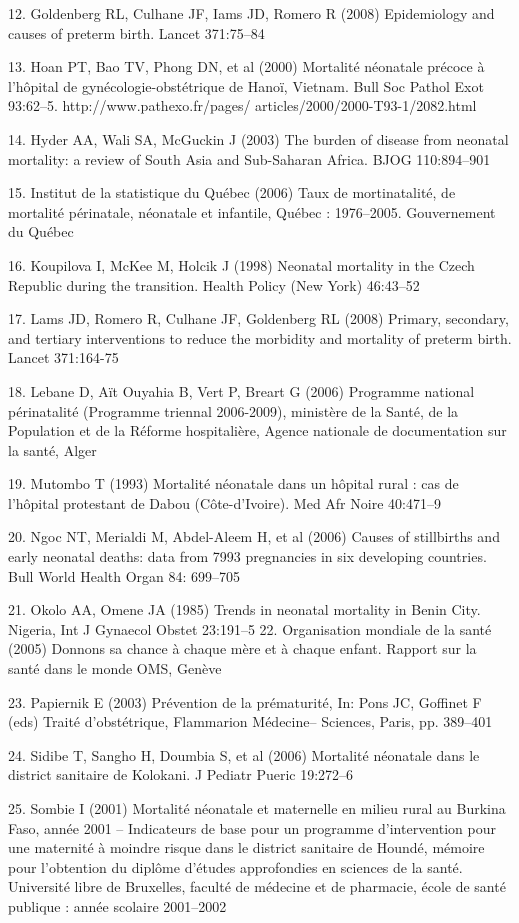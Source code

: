 12. Goldenberg RL, Culhane JF, Iams JD, Romero R (2008)
Epidemiology and causes of preterm birth. Lancet 371:75–84


13. Hoan PT, Bao TV, Phong DN, et al (2000) Mortalité néonatale
précoce à l’hôpital de gynécologie-obstétrique de Hanoï, Vietnam.
Bull Soc Pathol Exot 93:62–5. http://www.pathexo.fr/pages/
articles/2000/2000-T93-1/2082.html


14. Hyder AA, Wali SA, McGuckin J (2003) The burden of disease
from neonatal mortality: a review of South Asia and Sub-Saharan
Africa. BJOG 110:894–901


15. Institut de la statistique du Québec (2006) Taux de mortinatalité,
de mortalité périnatale, néonatale et infantile, Québec :
1976–2005. Gouvernement du Québec


16. Koupilova I, McKee M, Holcik J (1998) Neonatal mortality in the
Czech Republic during the transition. Health Policy (New York)
46:43–52


17. Lams JD, Romero R, Culhane JF, Goldenberg RL (2008) Primary,
secondary, and tertiary interventions to reduce the morbidity and
mortality of preterm birth. Lancet 371:164-75


18. Lebane D, Aït Ouyahia B, Vert P, Breart G (2006) Programme
national périnatalité (Programme triennal 2006-2009), ministère
de la Santé, de la Population et de la Réforme hospitalière, Agence
nationale de documentation sur la santé, Alger


19. Mutombo T (1993) Mortalité néonatale dans un hôpital rural : cas
de l’hôpital protestant de Dabou (Côte-d’Ivoire). Med Afr Noire
40:471–9


20. Ngoc NT, Merialdi M, Abdel-Aleem H, et al (2006) Causes of
stillbirths and early neonatal deaths: data from 7993 pregnancies
in six developing countries. Bull World Health Organ 84:
699–705


21. Okolo AA, Omene JA (1985) Trends in neonatal mortality in
Benin City. Nigeria, Int J Gynaecol Obstet 23:191–5
22. Organisation mondiale de la santé (2005) Donnons sa chance à
chaque mère et à chaque enfant. Rapport sur la santé dans le
monde OMS, Genève


23. Papiernik E (2003) Prévention de la prématurité, In: Pons JC,
Goffinet F (eds) Traité d’obstétrique, Flammarion Médecine–
Sciences, Paris, pp. 389–401


24. Sidibe T, Sangho H, Doumbia S, et al (2006) Mortalité
néonatale dans le district sanitaire de Kolokani. J Pediatr Pueric
19:272–6


25. Sombie I (2001) Mortalité néonatale et maternelle en milieu
rural au Burkina Faso, année 2001 – Indicateurs de base pour
un programme d’intervention pour une maternité à moindre
risque dans le district sanitaire de Houndé, mémoire pour
l’obtention du diplôme d’études approfondies en sciences de
la santé. Université libre de Bruxelles, faculté de médecine
et de pharmacie, école de santé publique : année scolaire
2001–2002	